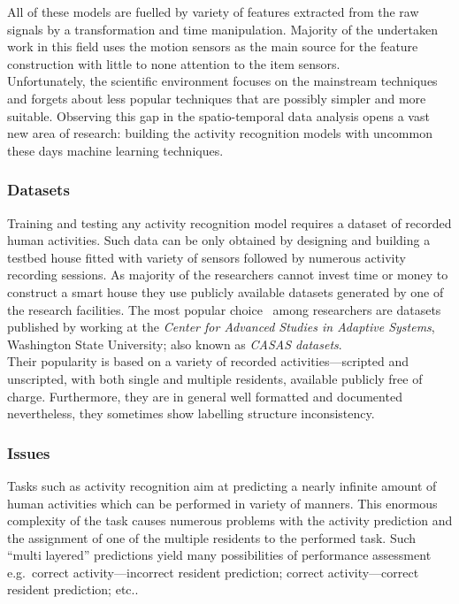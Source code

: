 \documentclass[10pt, a4paper, pdflatex, leqno, twoside, openright]{report}
\begin{document}
All of these models are fuelled by variety of features extracted from the raw signals by a transformation and time manipulation. Majority of the undertaken work in this field uses the motion sensors as the main source for the feature construction with little to none attention to the item sensors.\\

Unfortunately, the scientific environment focuses on the mainstream techniques and forgets about less popular techniques that are possibly simpler and more suitable. Observing this gap in the spatio-temporal data analysis opens a vast new area of research: building the activity recognition models with uncommon these days machine learning techniques.

      \subsubsection{Datasets}
Training and testing any activity recognition model requires a dataset of recorded human activities. Such data can be only obtained by designing and building a testbed house fitted with variety of sensors followed by numerous activity recording sessions. As majority of the researchers cannot invest time or money to construct a smart house they use publicly available datasets generated by one of the research facilities. The most popular choice~\citep{fatima2013unified,fatima2013analysis,nazerfard2010conditional,cook2009assessing} among researchers are datasets published by \citet{cook2009assessing} working at the \emph{Center for Advanced Studies in Adaptive Systems}, Washington State University; also known as \emph{CASAS datasets}.\\
Their popularity is based on a variety of recorded activities---scripted and unscripted, with both single and multiple residents, available publicly free of charge. Furthermore, they are in general well formatted and documented nevertheless, they sometimes show labelling structure inconsistency.

      \subsubsection{Issues}
Tasks such as activity recognition aim at predicting a nearly infinite amount of human activities which can be performed in variety of manners. This enormous complexity of the task causes numerous problems with the activity prediction and the assignment of one of the multiple residents to the performed task. Such ``multi layered'' predictions yield many possibilities of performance assessment e.g.\ correct activity---incorrect resident prediction; correct activity---correct resident prediction; etc..\\
\end{document}
